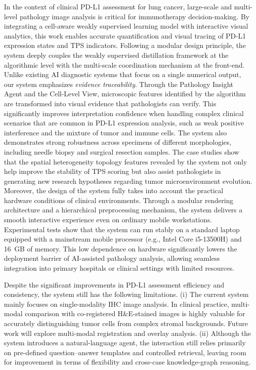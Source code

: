 \documentclass[journal]{vgtc}                     %
\begin{document}
In the context of clinical PD-L1 assessment for lung cancer, large-scale and multi-level pathology image analysis is critical for immunotherapy decision-making. By integrating a cell-aware weakly supervised learning model with interactive visual analytics, this work enables accurate quantification and visual tracing of PD-L1 expression states and TPS indicators. Following a modular design principle, the system deeply couples the weakly supervised distillation framework at the algorithmic level with the multi-scale coordination mechanism at the front-end. Unlike existing AI diagnostic systems that focus on a single numerical output, our system emphasizes \textit{evidence traceability}. Through the Pathology Insight Agent and the Cell-Level View, microscopic features identified by the algorithm are transformed into visual evidence that pathologists can verify. This significantly improves interpretation confidence when handling complex clinical scenarios that are common in PD-L1 expression analysis, such as weak positive interference and the mixture of tumor and immune cells. The system also demonstrates strong robustness across specimens of different morphologies, including needle biopsy and surgical resection samples. The case studies show that the spatial heterogeneity topology features revealed by the system not only help improve the stability of TPS scoring but also assist pathologists in generating new research hypotheses regarding tumor microenvironment evolution. Moreover, the design of the system fully takes into account the practical hardware conditions of clinical environments. Through a modular rendering architecture and a hierarchical preprocessing mechanism, the system delivers a smooth interactive experience even on ordinary mobile workstations. Experimental tests show that the system can run stably on a standard laptop equipped with a mainstream mobile processor (e.g., Intel Core i5-13500H) and 16~GB of memory. This low dependence on hardware significantly lowers the deployment barrier of AI-assisted pathology analysis, allowing seamless integration into primary hospitals or clinical settings with limited resources.

Despite the significant improvements in PD-L1 assessment efficiency and consistency, the system still has the following limitations. (i) The current system mainly focuses on single-modality IHC image analysis. In clinical practice, multi-modal comparison with co-registered H\&E-stained images is highly valuable for accurately distinguishing tumor cells from complex stromal backgrounds. Future work will explore multi-modal registration and overlay analysis. (ii) Although the system introduces a natural-language agent, the interaction still relies primarily on pre-defined question--answer templates and controlled retrieval, leaving room for improvement in terms of flexibility and cross-case knowledge-graph reasoning.
\end{document}
